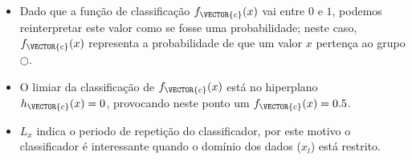 \begin{tcbattention}
\begin{itemize}
\item Dado que a função de classificação $f_{\VECTOR{c}}(x)$ vai entre $0$ e $1$,
podemos reinterpretar este valor como se fosse uma probabilidade;
neste caso, $f_{\VECTOR{c}}(x)$ representa a probabilidade de que um valor $x$
pertença ao grupo $\bigcirc$.
\item O limiar da classificação de $f_{\VECTOR{c}}(x)$ 
está no hiperplano $h_{\VECTOR{c}}(x)=0$,
provocando neste ponto um $f_{\VECTOR{c}}(x)=0.5$.
\item $L_x$ indica o periodo de repetição do classificador,
por este motivo o classificador é interessante quando o domínio dos dados ($x_l$) está restrito.
\end{itemize}
\end{tcbattention}

